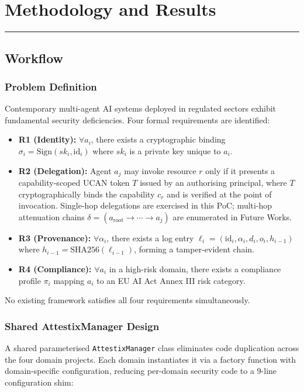 \chapter{Methodology and Results}
\noindent\rule{\linewidth}{2pt}

\section{Workflow}

\subsection{Problem Definition}

Contemporary multi-agent AI systems deployed in regulated sectors exhibit fundamental security deficiencies. Four formal requirements are identified:

\begin{itemize}
    \item \textbf{R1 (Identity):} $\forall a_i$, there exists a cryptographic binding $\sigma_i = \text{Sign}(sk_i, \text{id}_i)$ where $sk_i$ is a private key unique to $a_i$.
    \item \textbf{R2 (Delegation):} Agent $a_j$ may invoke resource $r$ only if it presents a capability-scoped UCAN token $T$ issued by an authorising principal, where $T$ cryptographically binds the capability $c_r$ and is verified at the point of invocation. Single-hop delegations are exercised in this PoC; multi-hop attenuation chains $\delta = (a_{\text{root}} \to \cdots \to a_j)$ are enumerated in Future Works.
    \item \textbf{R3 (Provenance):} $\forall \alpha_i$, there exists a log entry $\ell_i = (\text{id}_i, \alpha_i, d_i, o_i, h_{i-1})$ where $h_{i-1} = \text{SHA256}(\ell_{i-1})$, forming a tamper-evident chain.
    \item \textbf{R4 (Compliance):} $\forall a_i$ in a high-risk domain, there exists a compliance profile $\pi_i$ mapping $a_i$ to an EU AI Act Annex III risk category.
\end{itemize}

No existing framework satisfies all four requirements simultaneously.

\subsection{Shared AttestixManager Design}

A shared parameterised \texttt{AttestixManager} class eliminates code duplication across the four domain projects. Each domain instantiates it via a factory function with domain-specific configuration, reducing per-domain security code to a 9-line configuration shim:

